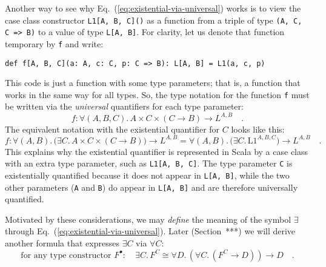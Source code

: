 Another way to see why Eq.~(\ref{eq:existential-via-universal})
works is to view the case class constructor \lstinline!L1[A, B, C]()!
as a function from a triple of type \lstinline!(A, C, C => B)!
to a value of type \lstinline!L[A, B]!.
For clarity, let us denote that function temporary by \lstinline!f!
and write:
\begin{lstlisting}
def f[A, B, C](a: A, c: C, p: C => B): L[A, B] = L1(a, c, p) 
\end{lstlisting}
This code is just a function with some type parameters; that is, a
function that works in the same way for all types. So, the type notation
for the function \lstinline!f!
must be written via the \emph{universal} quantifiers for each type
parameter:
\[
f:\forall(A,B,C).\,A\times C\times(C\rightarrow B)\rightarrow L^{A,B}\quad.
\]
The equivalent notation with the existential quantifier for $C$ looks
like this:
\[
f:\forall(A,B).\,\big(\exists C.\,A\times C\times(C\rightarrow B)\big)\rightarrow L^{A,B}=\forall(A,B).\,\big(\exists C.\,\text{L1}^{A,B,C})\rightarrow L^{A,B}\quad.
\]
This explains why the existential quantifier is represented in Scala
by a case class with an extra type parameter, such as \lstinline!L1[A, B, C]!.
The type parameter \lstinline!C!
is existentially quantified because it does not appear in \lstinline!L[A, B]!,
while the two other parameters (\lstinline!A!
and \lstinline!B!) do appear
in \lstinline!L[A, B]!
and are therefore universally quantified.

Motivated by these considerations, we may \emph{define} the meaning
of the symbol $\exists$ through Eq.~(\ref{eq:existential-via-universal}).
Later (Section~{*}{*}{*}) we will derive another formula that expresses
$\exists C$ via $\forall C$: 
\begin{equation}
\text{for any type constructor }F^{\bullet}:\quad\exists C.\,F^{C}\cong\forall D.\,(\forall C.\,(F^{C}\rightarrow D))\rightarrow D\quad.\label{eq:existential-via-universal-Yoneda}
\end{equation}


